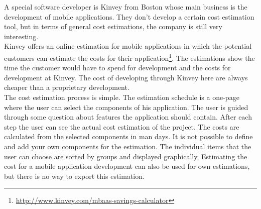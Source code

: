 A special software developer is Kinvey from Boston whose main business is the development of mobile applications. They don't develop a certain cost estimation tool, but in terms of general cost estimations, the company is still very interesting.
\\
Kinvey offers an online estimation for mobile applications in which the potential customers can estimate the costs for their application\footnote{\url{http://www.kinvey.com/mbaas-savings-calculator}}. The estimations show the time the customer would have to spend for development and the costs for development at Kinvey. The cost of developing through Kinvey here are always cheaper than a proprietary development.
\\
The cost estimation process is simple. The estimation schedule is a one-page where the user can select the components of his application. The user is guided through some question about features the application should contain. After each step the user can see the actual cost estimation of the project.
The costs are calculated from the selected components in man days. It is not possible to define and add your own components for the estimation. The individual items that the user can choose are sorted by groups and displayed graphically. Estimating the cost for a mobile application development can also be used for own estimations, but there is no way to export this estimation.
